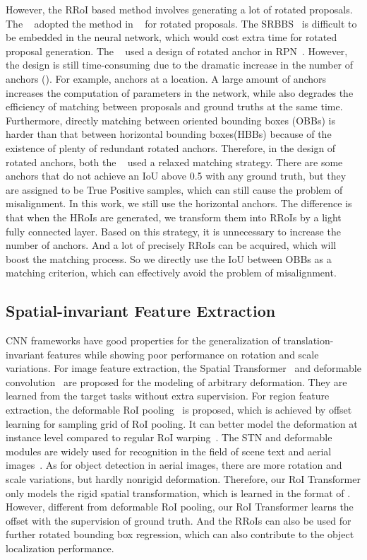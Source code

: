 \documentclass[11pt,onecolumn]{article}         \usepackage[top=3.6cm, bottom=3.2cm, left=2.3cm, right=2.3cm]{geometry}
\begin{document}
However, the RRoI based method involves generating a lot of rotated proposals. The ~\cite{RRCNN} adopted the method in ~\cite{SRBBS} for rotated proposals. The SRBBS~\cite{SRBBS} is difficult to be embedded in the neural network, which would cost extra time for rotated proposal generation. The ~\cite{RRPN, RSD, R-DFPN, azimi2018towards} used a design of rotated anchor in RPN~\cite{FasterR-CNN}. However, the design is still time-consuming due to the dramatic increase in the number of anchors (). For example,  anchors at a location. A large amount of anchors increases the computation of parameters in the network, while also degrades the efficiency of matching between proposals and ground truths at the same time. Furthermore, directly matching between oriented bounding boxes (OBBs) is harder than that between horizontal bounding boxes(HBBs) because of the existence of plenty of redundant rotated anchors. Therefore, in the design of rotated anchors, both the ~\cite{RRPN, drbox} used a relaxed matching strategy. There are some anchors that do not achieve an IoU above 0.5 with any ground truth, but they are assigned to be True Positive samples, which can still cause the problem of misalignment.
In this work, we still use the horizontal anchors. The difference is that when the HRoIs are generated, we transform them into RRoIs by a light fully connected layer. Based on this strategy, it is unnecessary to increase the number of anchors. And a lot of precisely RRoIs can be acquired, which will boost the matching process. So we directly use the IoU between OBBs as a matching criterion, which can effectively avoid the problem of misalignment.




\subsection{Spatial-invariant Feature Extraction}
CNN frameworks have good properties for the generalization of translation-invariant features while showing poor performance on rotation and scale variations. For image feature extraction, the Spatial Transformer~\cite{stn} and deformable convolution~\cite{Deformable} are proposed for the modeling of arbitrary deformation. They are learned from the target tasks without extra supervision. 
For region feature extraction, the deformable RoI  pooling~\cite{Deformable} is proposed, which is achieved by offset learning for sampling grid of RoI pooling. It can better model the deformation at instance level compared to regular RoI warping~\cite{Fast_RCNN, MaskRCNN, R-FCN}. The STN and deformable modules are widely used for recognition in the field of scene text and aerial images~\cite{inceptext, deformable_faster, text-two-dimension, shi2016robust,xu2017deformable}. As for object detection in aerial images, there are more rotation and scale variations, but hardly nonrigid deformation. Therefore, our RoI Transformer only models the rigid spatial transformation, which is learned in the format of . 
However, different from deformable RoI pooling, our RoI Transformer learns the offset with the supervision of ground truth. And the RRoIs can also be used for further rotated bounding box regression, which can also contribute to the object localization performance.
\end{document}
